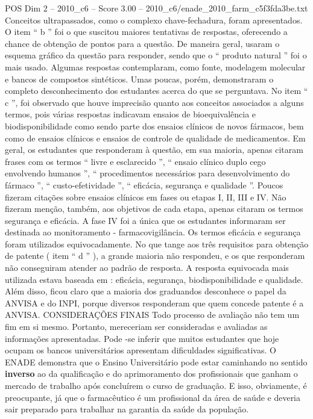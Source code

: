 \begin{textsample}{POS Dim 2 – 2010\_c6 – Score 3.00 – 2010\_c6/enade\_2010\_farm\_c5f3fda3be.txt}
Conceitos ultrapassados, como o complexo chave-fechadura, foram apresentados.
O item “ b ” foi o que suscitou maiores tentativas de respostas, oferecendo a chance de obtenção de pontos para a questão.
De maneira geral, usaram o esquema gráfico da questão para responder, sendo que o “ produto natural ” foi o mais usado.
Algumas respostas contemplaram, como fonte, modelagem molecular e bancos de compostos sintéticos.
Umas poucas, porém, demonstraram o completo desconhecimento dos estudantes acerca do que se perguntava.
No item “ c ”, foi observado que houve imprecisão quanto aos conceitos associados a alguns termos, pois várias respostas indicavam ensaios de bioequivalência e biodisponibilidade como sendo parte dos ensaios clínicos de novos fármacos, bem como de ensaios clínicos e ensaios de controle de qualidade de medicamentos.
Em geral, os estudantes que responderam à questão, em sua maioria, apenas citaram frases com os termos “ livre e esclarecido ”, “ ensaio clínico duplo cego envolvendo humanos ”, “ procedimentos necessários para desenvolvimento do fármaco ”, “ custo-efetividade ”, “ eficácia, segurança e qualidade ”.
Poucos fizeram citações sobre ensaios clínicos em fases ou etapas I, II, III e IV.
Não fizeram menção, também, aos objetivos de cada etapa, apenas citaram os termos segurança e eficácia.
A fase IV foi a única que os estudantes informaram ser destinada ao monitoramento - farmacovigilância.
Os termos eficácia e segurança foram utilizados equivocadamente.
No que tange aos três requisitos para obtenção de patente ( item “ d ” ), a grande maioria não respondeu, e os que responderam não conseguiram atender ao padrão de resposta.
A resposta equivocada mais utilizada estava baseada em : eficácia, segurança, biodisponibilidade e qualidade.
Além disso, ficou claro que a maioria dos graduandos desconhece o papel da ANVISA e do INPI, porque diversos responderam que quem concede patente é a ANVISA.
CONSIDERAÇÕES FINAIS Todo processo de avaliação não tem um fim em si mesmo.
Portanto, mereceriam ser consideradas e avaliadas as informações apresentadas.
Pode -se inferir que muitos estudantes que hoje ocupam os bancos universitários apresentam dificuldades significativas.
O ENADE demonstra que o Ensino Universitário pode estar caminhando no sentido \textbf{inverso} ao da qualificação e do aprimoramento dos profissionais que ganham o mercado de trabalho após concluírem o curso de graduação.
E isso, obviamente, é preocupante, já que o farmacêutico é um profissional da área de saúde e deveria sair preparado para trabalhar na garantia da saúde da população.

\end{textsample}

